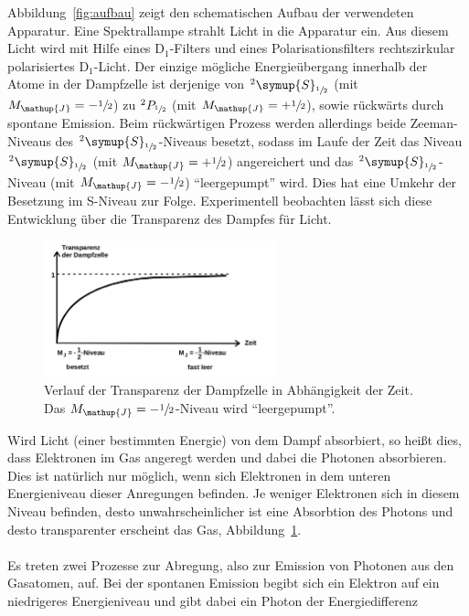 \documentclass[
  bibliography=totoc,     %
  captions=tableheading,  %
  titlepage=firstiscover, %
]{scrartcl}
\begin{document}
\noindent
Abbildung~\ref{fig:aufbau} zeigt den schematischen Aufbau der verwendeten
Apparatur. Eine Spektrallampe strahlt Licht in die Apparatur ein. Aus diesem
Licht wird mit Hilfe eines $\text{D}_1$-Filters und eines Polarisationsfilters
rechtszirkular polarisiertes $\text{D}_1$-Licht. Der einzige mögliche
Energieübergang innerhalb der Atome in der Dampfzelle ist derjenige von
$^2\symup{S}_{\sfrac{1}{2}}$ (mit $M_{\mathup{J}}=-\sfrac{1}{2}$) zu
$^2P_{\sfrac{1}{2}}$ (mit $M_{\mathup{J}}=+\sfrac{1}{2}$), sowie rückwärts durch
spontane Emission. Beim rückwärtigen Prozess werden allerdings beide
Zeeman-Niveaus des $^2\symup{S}_{\sfrac{1}{2}}$-Niveaus besetzt, sodass im
Laufe der Zeit das Niveau $^2\symup{S}_{\sfrac{1}{2}}$ (mit
$M_{\mathup{J}}=+\sfrac{1}{2}$) angereichert und das
$^2\symup{S}_{\sfrac{1}{2}}$-Niveau (mit $M_{\mathup{J}}=-\sfrac{1}{2}$)
\enquote{leergepumpt} wird. Dies hat eine Umkehr der Besetzung im S-Niveau zur
Folge. Experimentell beobachten lässt sich diese Entwicklung über die
Transparenz des Dampfes für Licht.
%
\begin{figure}[htb]
  \centering
  \includegraphics[width=0.6\textwidth]{transparenz.pdf}
  \caption{Verlauf der Transparenz der Dampfzelle in Abhängigkeit der Zeit. Das $M_{\mathup{J}}=-\sfrac{1}{2}$-Niveau wird \enquote{leergepumpt}\cite{anleitung}.}
  \label{fig:transparenz}
\end{figure}
\noindent
Wird Licht (einer bestimmten Energie) von dem Dampf absorbiert, so heißt dies,
dass Elektronen im Gas angeregt werden und dabei die Photonen absorbieren. Dies
ist natürlich nur möglich, wenn sich Elektronen in dem unteren Energieniveau
dieser Anregungen befinden. Je weniger Elektronen sich in diesem Niveau
befinden, desto unwahrscheinlicher ist eine Absorbtion des Photons und desto
transparenter erscheint das Gas, Abbildung~\ref{fig:transparenz}. \\
\\
Es treten zwei Prozesse zur Abregung, also zur Emission von Photonen aus den
Gasatomen, auf. Bei der spontanen Emission begibt sich ein Elektron auf
ein niedrigeres Energieniveau und gibt dabei ein Photon der Energiedifferenz
\end{document}
